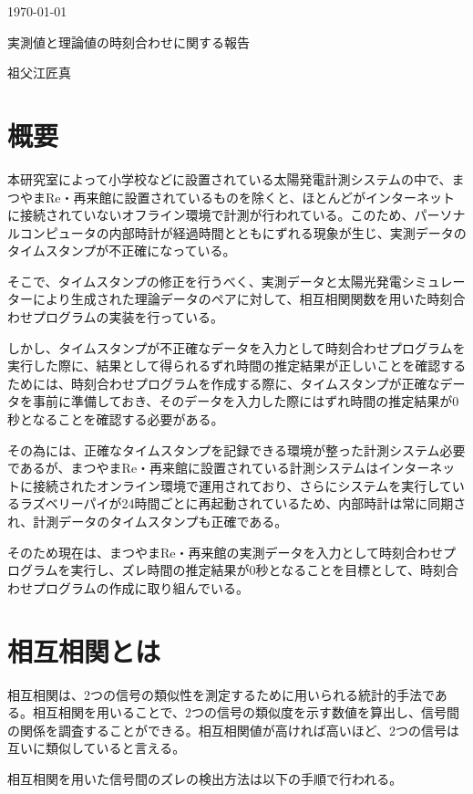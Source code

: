 \documentclass[a4j,12pt,]{jarticle}
\begin{document}
{\noindent\small  \hfill\today}
\begin{center}
  {\Large 実測値と理論値の時刻合わせに関する報告}
\end{center}
\begin{flushright}
  祖父江匠真 \\
\end{flushright}

\section{概要}
本研究室によって小学校などに設置されている太陽発電計測システムの中で、まつやまRe・再来館に設置されているものを除くと、ほとんどがインターネットに接続されていないオフライン環境で計測が行われている。このため、パーソナルコンピュータの内部時計が経過時間とともにずれる現象が生じ、実測データのタイムスタンプが不正確になっている。

そこで、タイムスタンプの修正を行うべく、実測データと太陽光発電シミュレーターにより生成された理論データのペアに対して、相互相関関数を用いた時刻合わせプログラムの実装を行っている。

しかし、タイムスタンプが不正確なデータを入力として時刻合わせプログラムを実行した際に、結果として得られるずれ時間の推定結果が正しいことを確認するためには、時刻合わせプログラムを作成する際に、タイムスタンプが正確なデータを事前に準備しておき、そのデータを入力した際にはずれ時間の推定結果が0秒となることを確認する必要がある。

その為には、正確なタイムスタンプを記録できる環境が整った計測システム必要であるが、まつやまRe・再来館に設置されている計測システムはインターネットに接続されたオンライン環境で運用されており、さらにシステムを実行しているラズベリーパイが24時間ごとに再起動されているため、内部時計は常に同期され、計測データのタイムスタンプも正確である。

そのため現在は、まつやまRe・再来館の実測データを入力として時刻合わせプログラムを実行し、ズレ時間の推定結果が0秒となることを目標として、時刻合わせプログラムの作成に取り組んでいる。

\section{相互相関とは}
相互相関は、2つの信号の類似性を測定するために用いられる統計的手法である。相互相関を用いることで、2つの信号の類似度を示す数値を算出し、信号間の関係を調査することができる。相互相関値が高ければ高いほど、2つの信号は互いに類似していると言える。

相互相関を用いた信号間のズレの検出方法は以下の手順で行われる。
\end{document}
